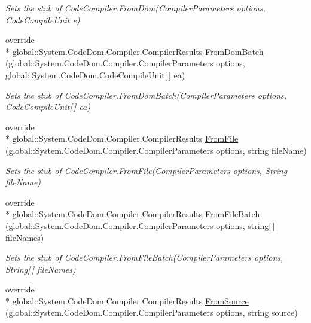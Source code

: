 \begin{DoxyCompactItemize}
\begin{DoxyCompactList}\small\item\em Sets the stub of Code\-Compiler.\-From\-Dom(\-Compiler\-Parameters options, Code\-Compile\-Unit e)\end{DoxyCompactList}\item 
override \\*
global\-::\-System.\-Code\-Dom.\-Compiler.\-Compiler\-Results \hyperlink{class_system_1_1_code_dom_1_1_compiler_1_1_fakes_1_1_stub_code_compiler_a214b5cfb032bd2c5874f5812bacba70c}{From\-Dom\-Batch} (global\-::\-System.\-Code\-Dom.\-Compiler.\-Compiler\-Parameters options, global\-::\-System.\-Code\-Dom.\-Code\-Compile\-Unit\mbox{[}$\,$\mbox{]} ea)
\begin{DoxyCompactList}\small\item\em Sets the stub of Code\-Compiler.\-From\-Dom\-Batch(\-Compiler\-Parameters options, Code\-Compile\-Unit\mbox{[}$\,$\mbox{]} ea)\end{DoxyCompactList}\item 
override \\*
global\-::\-System.\-Code\-Dom.\-Compiler.\-Compiler\-Results \hyperlink{class_system_1_1_code_dom_1_1_compiler_1_1_fakes_1_1_stub_code_compiler_a21a7b3d5531b8b118e3143723f1024f8}{From\-File} (global\-::\-System.\-Code\-Dom.\-Compiler.\-Compiler\-Parameters options, string file\-Name)
\begin{DoxyCompactList}\small\item\em Sets the stub of Code\-Compiler.\-From\-File(\-Compiler\-Parameters options, String file\-Name)\end{DoxyCompactList}\item 
override \\*
global\-::\-System.\-Code\-Dom.\-Compiler.\-Compiler\-Results \hyperlink{class_system_1_1_code_dom_1_1_compiler_1_1_fakes_1_1_stub_code_compiler_a87dab1c9c5995d3c02d6ec0b5e595193}{From\-File\-Batch} (global\-::\-System.\-Code\-Dom.\-Compiler.\-Compiler\-Parameters options, string\mbox{[}$\,$\mbox{]} file\-Names)
\begin{DoxyCompactList}\small\item\em Sets the stub of Code\-Compiler.\-From\-File\-Batch(\-Compiler\-Parameters options, String\mbox{[}$\,$\mbox{]} file\-Names)\end{DoxyCompactList}\item 
override \\*
global\-::\-System.\-Code\-Dom.\-Compiler.\-Compiler\-Results \hyperlink{class_system_1_1_code_dom_1_1_compiler_1_1_fakes_1_1_stub_code_compiler_abc59ba97a4637d61e8a05e2165ed48e5}{From\-Source} (global\-::\-System.\-Code\-Dom.\-Compiler.\-Compiler\-Parameters options, string source)

\end{DoxyCompactItemize}
